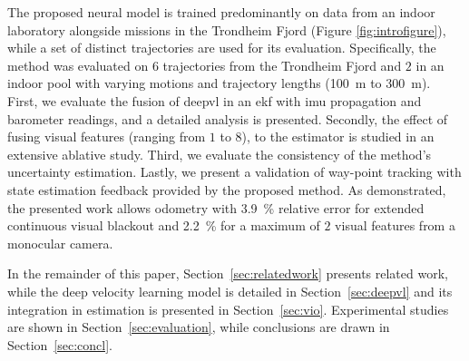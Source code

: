 The proposed neural model is trained predominantly on data from an indoor laboratory alongside missions in the Trondheim Fjord (Figure \ref{fig:introfigure}), while a set of distinct trajectories are used for its evaluation. Specifically, the method was evaluated on $6$ trajectories from the Trondheim Fjord and $2$ in an indoor pool with varying motions and trajectory lengths (\SI{100}{\meter} to \SI{300}{\meter}). First, we evaluate the fusion of \ac{deepvl} in an \ac{ekf} with \ac{imu} propagation and barometer readings, and a detailed analysis is presented. Secondly, the effect of fusing visual features (ranging from $1$ to $8$), to the estimator is studied in an extensive ablative study. Third, we evaluate the consistency of the method's uncertainty estimation. Lastly, we present a validation of way-point tracking with state estimation feedback provided by the proposed method. As demonstrated, the presented work allows odometry with \SI{3.9}{\percent} relative error for extended continuous visual blackout and \SI{2.2}{\percent} for a maximum of $2$ visual features from a monocular camera. 

In the remainder of this paper, Section~\ref{sec:relatedwork} presents related work, while the deep velocity learning model is detailed in Section~\ref{sec:deepvl} and its integration in estimation is presented in Section~\ref{sec:vio}. Experimental studies are shown in Section~\ref{sec:evaluation}, while conclusions are drawn in Section~\ref{sec:concl}.
